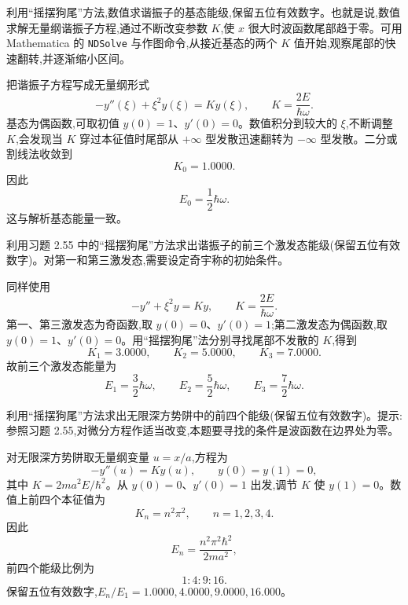 \begin{question}
利用“摇摆狗尾”方法,数值求谐振子的基态能级,保留五位有效数字。也就是说,数值求解无量纲谐振子方程,通过不断改变参数 $K$,使 $x$ 很大时波函数尾部趋于零。可用 Mathematica 的 \texttt{NDSolve} 与作图命令,从接近基态的两个 $K$ 值开始,观察尾部的快速翻转,并逐渐缩小区间。
\end{question}
\begin{solution}
把谐振子方程写成无量纲形式
\[
-y''(\xi)+\xi^2y(\xi)=Ky(\xi),
\qquad K=\frac{2E}{\hbar\omega}.
\]
基态为偶函数,可取初值 $y(0)=1$、$y'(0)=0$。数值积分到较大的 $\xi$,不断调整 $K$,会发现当 $K$ 穿过本征值时尾部从 $+\infty$ 型发散迅速翻转为 $-\infty$ 型发散。二分或割线法收敛到
\[
K_0=1.0000.
\]
因此
\[
E_0=\frac12\hbar\omega.
\]
这与解析基态能量一致。
\end{solution}

\begin{question}
利用习题 2.55 中的“摇摆狗尾”方法求出谐振子的前三个激发态能级(保留五位有效数字)。对第一和第三激发态,需要设定奇宇称的初始条件。
\end{question}
\begin{solution}
同样使用
\[
-y''+\xi^2y=Ky,
\qquad K=\frac{2E}{\hbar\omega}.
\]
第一、第三激发态为奇函数,取 $y(0)=0$、$y'(0)=1$;第二激发态为偶函数,取 $y(0)=1$、$y'(0)=0$。用“摇摆狗尾”法分别寻找尾部不发散的 $K$,得到
\[
K_1=3.0000,
\qquad
K_2=5.0000,
\qquad
K_3=7.0000.
\]
故前三个激发态能量为
\[
E_1=\frac32\hbar\omega,
\qquad
E_2=\frac52\hbar\omega,
\qquad
E_3=\frac72\hbar\omega.
\]
\end{solution}

\begin{question}
利用“摇摆狗尾”方法求出无限深方势阱中的前四个能级(保留五位有效数字)。提示:参照习题 2.55,对微分方程作适当改变,本题要寻找的条件是波函数在边界处为零。
\end{question}
\begin{solution}
对无限深方势阱取无量纲变量 $u=x/a$,方程为
\[
-y''(u)=Ky(u),
\qquad y(0)=y(1)=0,
\]
其中 $K=2ma^2E/\hbar^2$。从 $y(0)=0$、$y'(0)=1$ 出发,调节 $K$ 使 $y(1)=0$。数值上前四个本征值为
\[
K_n=n^2\pi^2,
\qquad n=1,2,3,4.
\]
因此
\[
E_n=\frac{n^2\pi^2\hbar^2}{2ma^2},
\]
前四个能级比例为
\[
1:4:9:16.
\]
保留五位有效数字,$E_n/E_1=1.0000,4.0000,9.0000,16.000$。
\end{solution}

